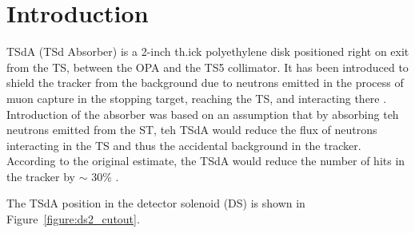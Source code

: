 \documentclass[12pt]{article}
\begin{document}
% 

% 
% 
% 
\newpage
\section {Introduction}

TSdA (TSd Absorber) is a 2-inch th.ick polyethylene disk positioned right
on exit from the TS, between the OPA and the TS5 collimator.
It has been introduced to shield the tracker from the background due to neutrons
emitted in the process of muon capture in the stopping target, reaching the TS, 
and interacting there \cite{MU2E_3479_NEUTRON_SHIELDING}. Introduction of the 
absorber was based on an assumption that by absorbing teh neutrons emitted from the ST,
teh TSdA would reduce the flux of neutrons interacting in the TS and thus the accidental
background in the tracker.
% 
According to the original estimate, the TSdA would reduce the number of hits
in the tracker by $\sim$ 30\% \cite{MU2E_3479_NEUTRON_SHIELDING}.

The TSdA position in the detector solenoid (DS) is shown in Figure~\ref{figure:ds2_cutout}.
\end{document}
